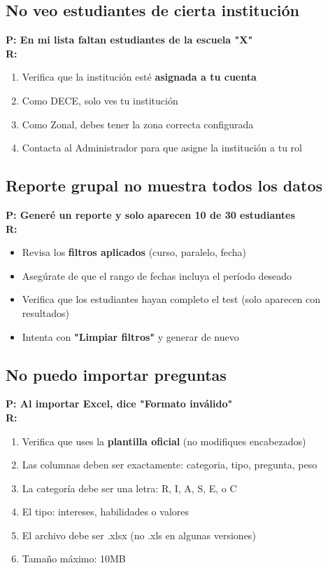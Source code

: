 \documentclass[12pt, a4paper]{report}
\begin{document}
\subsection{No veo estudiantes de cierta institución}
\textbf{P: En mi lista faltan estudiantes de la escuela "X"}\\
\textbf{R:}
\begin{enumerate}
    \item Verifica que la institución esté \textbf{asignada a tu cuenta}
    \item Como DECE, solo ves tu institución
    \item Como Zonal, debes tener la zona correcta configurada
    \item Contacta al Administrador para que asigne la institución a tu rol
\end{enumerate}

\subsection{Reporte grupal no muestra todos los datos}
\textbf{P: Generé un reporte y solo aparecen 10 de 30 estudiantes}\\
\textbf{R:}
\begin{itemize}
    \item Revisa los \textbf{filtros aplicados} (curso, paralelo, fecha)
    \item Asegúrate de que el rango de fechas incluya el período deseado
    \item Verifica que los estudiantes hayan completo el test (solo aparecen con resultados)
    \item Intenta con \textbf{"Limpiar filtros"} y generar de nuevo
\end{itemize}

\subsection{No puedo importar preguntas}
\textbf{P: Al importar Excel, dice "Formato inválido"}\\
\textbf{R:}
\begin{enumerate}
    \item Verifica que uses la \textbf{plantilla oficial} (no modifiques encabezados)
    \item Las columnas deben ser exactamente: categoria, tipo, pregunta, peso
    \item La categoría debe ser una letra: R, I, A, S, E, o C
    \item El tipo: intereses, habilidades o valores
    \item El archivo debe ser .xlsx (no .xls en algunas versiones)
    \item Tamaño máximo: 10MB
\end{enumerate}
\end{document}

